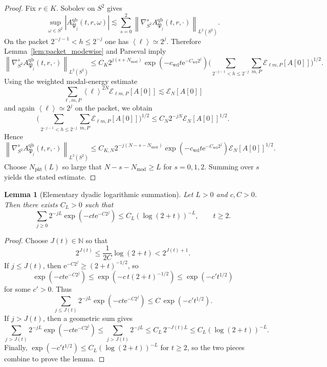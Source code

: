 \documentclass[12pt]{article}
\numberwithin{equation}{section}
\theoremstyle{plain}
\newtheorem{lemma}[theorem]{Lemma}
\theoremstyle{definition}
\theoremstyle{remark}
\newcommand{\N}{\mathbb N}
\newcommand{\ee}{\mathrm e}
\newcommand{\qb}{\mathrm{qb}}
\newcommand{\angles}[1]{\left\langle #1 \right\rangle}
\newcommand{\abs}[1]{\left|#1\right|}
\newcommand{\norm}[1]{\left\|#1\right\|}
\begin{document}
\begin{proof}
Fix $r\in K$.  Sobolev on $S^2$ gives
\[
   \sup_{\omega\in S^2}\abs{A^{\qb}_{\mathfrak P_j}(t,r,\omega)}
   \lesssim
   \sum_{s=0}^2\norm{\nabla_{S^2}^sA^{\qb}_{\mathfrak P_j}(t,r,\cdot)}_{L^2(S^2)}.
\]
On the packet $2^{-j-1}<h\le2^{-j}$ one has $\angles{\ell}\simeq2^j$.  Therefore Lemma~\ref{lem:packet_modewise} and Parseval imply
\[
   \norm{\nabla_{S^2}^sA^{\qb}_{\mathfrak P_j}(t,r,\cdot)}_{L^2(S^2)}
   \le
   C_K2^{j(s+N_{\mathrm{mod}})}\exp(-c_{\mathrm{wd}}t\ee^{-C_{\mathrm{wd}}2^j})
   \Biggl(
      \sum_{2^{-j-1}<h\le2^{-j}}\sum_{m,P}\mathcal E_{\ell m,P}[A[0]]
   \Biggr)^{1/2}.
\]
Using the weighted modal-energy estimate
\[
   \sum_{\ell,m,P}\angles{\ell}^{2N}\mathcal E_{\ell m,P}[A[0]]
   \lesssim
   \mathcal E_N[A[0]]
\]
and again $\angles{\ell}\simeq2^j$ on the packet, we obtain
\[
   \Biggl(
      \sum_{2^{-j-1}<h\le2^{-j}}\sum_{m,P}\mathcal E_{\ell m,P}[A[0]]
   \Biggr)^{1/2}
   \le
   C_N2^{-jN}\mathcal E_N[A[0]]^{1/2}.
\]
Hence
\[
   \norm{\nabla_{S^2}^sA^{\qb}_{\mathfrak P_j}(t,r,\cdot)}_{L^2(S^2)}
   \le
   C_{K,N}2^{-j(N-s-N_{\mathrm{mod}})}
   \exp(-c_{\mathrm{wd}}t\ee^{-C_{\mathrm{wd}}2^j})
   \mathcal E_N[A[0]]^{1/2}.
\]
Choose $N_{\mathrm{pkt}}(L)$ so large that $N-s-N_{\mathrm{mod}}\ge L$ for $s=0,1,2$.  Summing over $s$ yields the stated estimate.
\end{proof}

\begin{lemma}[Elementary dyadic logarithmic summation]\label{lem:packet_log_sum}
Let $L>0$ and $c,C>0$.  Then there exists $C_L>0$ such that
\[
   \sum_{j\ge0}2^{-jL}\exp(-ct\ee^{-C2^j})
   \le
   C_L(\log(2+t))^{-L},
   \qquad t\ge2.
\]
\end{lemma}

\begin{proof}
Choose $J(t)\in\N$ so that
\[
   2^{J(t)}\le \frac{1}{2C}\log(2+t)<2^{J(t)+1}.
\]
If $j\le J(t)$, then $\ee^{-C2^j}\ge (2+t)^{-1/2}$, so
\[
   \exp(-ct\ee^{-C2^j})
   \le
   \exp(-c\,t(2+t)^{-1/2})
   \le
   \exp(-c't^{1/2})
\]
for some $c'>0$.  Thus
\[
   \sum_{j\le J(t)}2^{-jL}\exp(-ct\ee^{-C2^j})
   \le
   C\,\exp(-c't^{1/2}).
\]
If $j>J(t)$, then a geometric sum gives
\[
   \sum_{j>J(t)}2^{-jL}\exp(-ct\ee^{-C2^j})
   \le
   \sum_{j>J(t)}2^{-jL}
   \le
   C_L\,2^{-J(t)L}
   \le
   C_L(\log(2+t))^{-L}.
\]
Finally, $\exp(-c't^{1/2})\le C_L(\log(2+t))^{-L}$ for $t\ge2$, so the two pieces combine to prove the lemma.
\end{proof}
\end{document}
